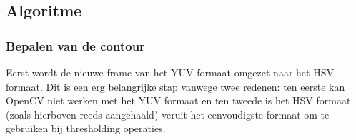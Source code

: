 %

\subsection{Algoritme}

\subsubsection*{Bepalen van de contour}

Eerst wordt de nieuwe frame van het YUV formaat omgezet naar het HSV formaat. Dit is een erg belangrijke stap vanwege twee redenen: ten eerste kan OpenCV niet werken met het YUV formaat en ten tweede is het HSV formaat (zoals hierboven reeds aangehaald) veruit het eenvoudigste formaat om te gebruiken bij thresholding operaties.


